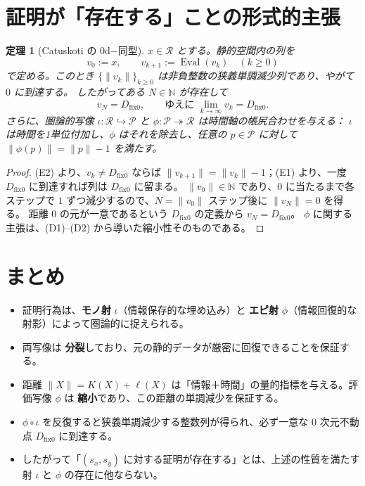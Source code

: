 \documentclass[12pt,a4paper]{article}
\newcommand{\dfix}{D_{\mathrm{fix}0}} %
\newcommand{\Rep}{\mathcal{R}}           %
\newcommand{\Prf}{\mathcal{P}}           %
\newtheorem{theorem}{定理}[section]
\begin{document}
\section{証明が「存在する」ことの形式的主張}

\begin{theorem}[Catuskoti の $0$d$-$同型]\label{thm:c4-dfix}
$x\in\Rep$ とする。静的空間内の列を
\[
  v_0:=x,\qquad v_{k+1}:=\operatorname{Eval}(v_k)\quad(k\ge 0)
\]
で定める。このとき $\{\|v_k\|\}_{k\ge0}$ は非負整数の狭義単調減少列であり、やがて $0$ に到達する。
したがってある $N\in\mathbb{N}$ が存在して
\[
  v_N=\dfix,\qquad\text{ゆえに }\lim_{k\to\infty}v_k=\dfix.
\]
さらに、圏論的写像 $\iota:\Rep\hookrightarrow\Prf$ と $\phi:\Prf\twoheadrightarrow\Rep$ は時間軸の帳尻合わせを与える：
$\iota$ は時間を1単位付加し、$\phi$ はそれを除去し、任意の $p\in\Prf$ に対して $\|\phi(p)\|=\|p\|-1$ を満たす。
\end{theorem}
\begin{proof}
(E2) より、$v_k\neq\dfix$ ならば $\|v_{k+1}\|=\|v_k\|-1$；(E1) より、一度 $\dfix$ に到達すれば列は $\dfix$ に留まる。
$\|v_0\|\in\mathbb{N}$ であり、$0$ に当たるまで各ステップで $1$ ずつ減少するので、$N=\|v_0\|$ ステップ後に $\|v_N\|=0$ を得る。
距離 $0$ の元が一意であるという $\dfix$ の定義から $v_N=\dfix$。
$\phi$ に関する主張は、(D1)--(D2) から導いた縮小性そのものである。
\end{proof}

\section{まとめ}

\begin{itemize}[nosep]
  \item 証明行為は、\textbf{モノ射} $\iota$（情報保存的な埋め込み）と \textbf{エピ射} $\phi$（情報回復的な射影）によって圏論的に捉えられる。
  \item 両写像は \textbf{分裂}しており、元の静的データが厳密に回復できることを保証する。
  \item 距離 $\|X\|=K(X)+\ell(X)$ は「情報＋時間」の量的指標を与える。評価写像 $\phi$ は \textbf{縮小}であり、この距離の単調減少を保証する。
  \item $\phi\circ\iota$ を反復すると狭義単調減少する整数列が得られ、必ず一意な $0$ 次元不動点 $\dfix$ に到達する。
  \item したがって「$(s_x,s_y)$ に対する証明が存在する」とは、上述の性質を満たす射 $\iota$ と $\phi$ の存在に他ならない。
\end{itemize}
\end{document}
